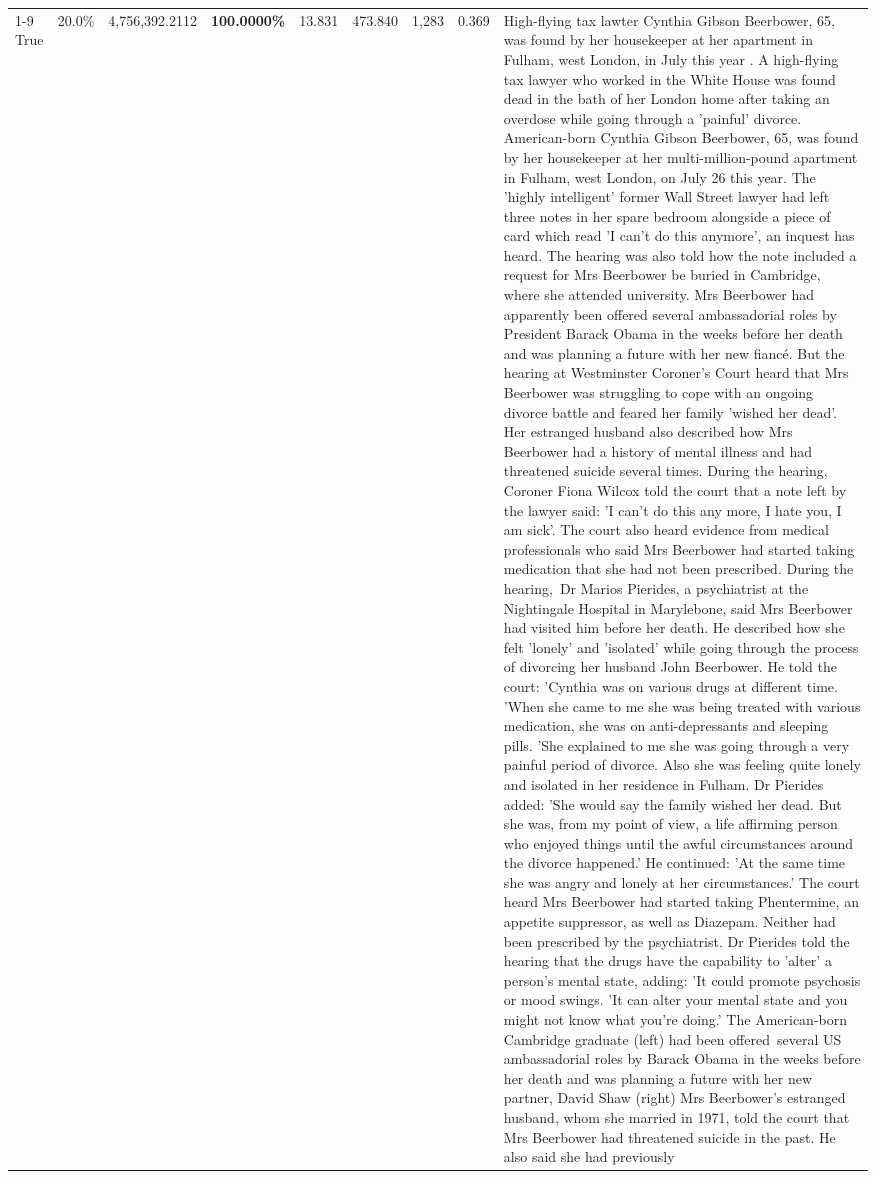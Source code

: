 \begin{table}[H]
\begin{tabular}{lllrlllll}
\cline{1-9}
True & 20.0\% & 4,756,392.2112 & \bfseries \color{red} 100.0000\% & 13.831 & 473.840 & 1,283 & 0.369 & High-flying tax lawter Cynthia Gibson Beerbower, 65, was found by her housekeeper at her apartment in Fulham, west London, in July this year . A high-flying tax lawyer who worked in the White House was found dead in the bath of her London home after taking an overdose while going through a 'painful' divorce. American-born Cynthia Gibson Beerbower, 65, was found by her housekeeper at her multi-million-pound apartment in Fulham, west London, on July 26 this year. The 'highly intelligent' former Wall Street lawyer had left three notes in her spare bedroom alongside a piece of card which read 'I can't do this anymore', an inquest has heard. The hearing was also told how the note included a request for Mrs Beerbower be buried in Cambridge, where she attended university. Mrs Beerbower had apparently been offered several ambassadorial roles by President Barack Obama in the weeks before her death and was planning a future with her new fiancé. But the hearing at Westminster Coroner's Court heard that Mrs Beerbower was struggling to cope with an ongoing divorce battle and feared her family 'wished her dead'. Her estranged husband also described how Mrs Beerbower had a history of mental illness and had threatened suicide several times. During the hearing, Coroner Fiona Wilcox told the court that a note left by the lawyer said: 'I can't do this any more, I hate you, I am sick'. The court also heard evidence from medical professionals who said Mrs Beerbower had started taking medication that she had not been prescribed. During the hearing, Dr Marios Pierides, a psychiatrist at the Nightingale Hospital in Marylebone, said Mrs Beerbower had visited him before her death. He described how she felt 'lonely' and 'isolated' while going through the process of divorcing her husband John Beerbower. He told the court: 'Cynthia was on various drugs at different time. 'When she came to me she was being treated with various medication, she was on anti-depressants and sleeping pills. 'She explained to me she was going through a very painful period of divorce. Also she was feeling quite lonely and isolated in her residence in Fulham. Dr Pierides added: 'She would say the family wished her dead. But she was, from my point of view, a life affirming person who enjoyed things until the awful circumstances around the divorce happened.' He continued: 'At the same time she was angry and lonely at her circumstances.' The court heard Mrs Beerbower had started taking Phentermine, an appetite suppressor, as well as Diazepam. Neither had been prescribed by the psychiatrist. Dr Pierides told the hearing that the drugs have the capability to 'alter' a person's mental state, adding: 'It could promote psychosis or mood swings. 'It can alter your mental state and you might not know what you're doing.' The American-born Cambridge graduate (left) had been offered several US ambassadorial roles by Barack Obama in the weeks before her death and was planning a future with her new partner, David Shaw (right) Mrs Beerbower's estranged husband, whom she married in 1971, told the court that Mrs Beerbower had threatened suicide in the past. He also said she had previously 
\end{tabular}
\end{table}
